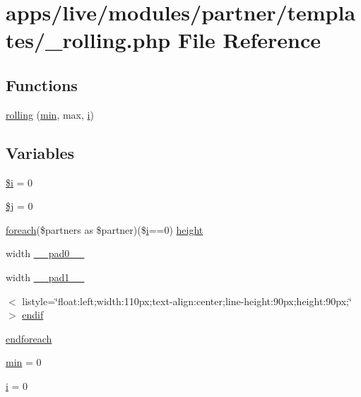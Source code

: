\hypertarget{live_2modules_2partner_2templates_2__rolling_8php}{\section{apps/live/modules/partner/templates/\-\_\-rolling.php File Reference}
\label{live_2modules_2partner_2templates_2__rolling_8php}
}
\subsection*{Functions}
\begin{DoxyCompactItemize}
\item 
\hyperlink{live_2modules_2partner_2templates_2__rolling_8php_a3c8cb76c55e564f219412cc8bc0fc283}{rolling} (\hyperlink{live_2modules_2partner_2templates_2__rolling_8php_a4735a0c4d1b11f62ea44115d54a93087}{min}, max, \hyperlink{live_2modules_2partner_2templates_2__rolling_8php_a7e98b8a17c0aad30ba64d47b74e2a6c1}{i})
\end{DoxyCompactItemize}
\subsection*{Variables}
\begin{DoxyCompactItemize}
\item 
\hyperlink{live_2modules_2partner_2templates_2__rolling_8php_a83018d9153d17d91fbcf3bc10158d34f}{\$i} = 0
\item 
\hyperlink{live_2modules_2partner_2templates_2__rolling_8php_a6f16db779ef3ccea921b277b5dc245d1}{\$j} = 0
\item 
\hyperlink{presse_2modules_2news_2templates_2index_success_8php_abc56db52b2e9a59bcd5c9e45ac5cb332}{foreach}(\$partners as \$partner)(\$\hyperlink{live_2modules_2partner_2templates_2__rolling_8php_a7e98b8a17c0aad30ba64d47b74e2a6c1}{i}==0) \hyperlink{live_2modules_2partner_2templates_2__rolling_8php_aea65f358ba50c3ef234d1b922c6ffd8c}{height}
\item 
width \hyperlink{live_2modules_2partner_2templates_2__rolling_8php_a846895d71862b7604adab4e827372218}{\-\_\-\-\_\-pad0\-\_\-\-\_\-}
\item 
width \hyperlink{live_2modules_2partner_2templates_2__rolling_8php_ad80c48d5a0183282f5cd7896642a0219}{\-\_\-\-\_\-pad1\-\_\-\-\_\-}
\item 
$<$ listyle=\char`\"{}float\-:left;width\-:110px;text-\/align\-:center;line-\/height\-:90px;height\-:90px;\char`\"{}$>$ \hyperlink{live_2modules_2partner_2templates_2__rolling_8php_adea01712e18f507dd4471d6f2c1cd4b8}{endif}
\item 
\hyperlink{live_2modules_2partner_2templates_2__rolling_8php_a672d9707ef91db026c210f98cc601123}{endforeach}
\item 
\hyperlink{live_2modules_2partner_2templates_2__rolling_8php_a4735a0c4d1b11f62ea44115d54a93087}{min} = 0
\item 
\hyperlink{live_2modules_2partner_2templates_2__rolling_8php_a7e98b8a17c0aad30ba64d47b74e2a6c1}{i} = 0
\end{DoxyCompactItemize}


